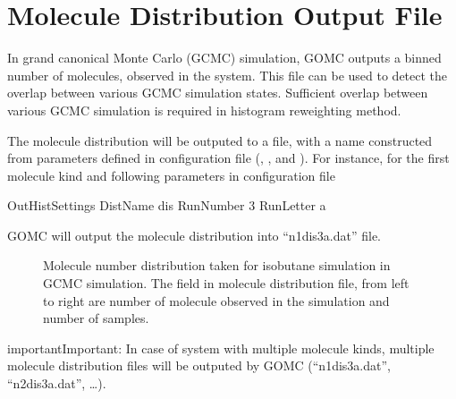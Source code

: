 \documentclass[letterpaper,10pt,english]{sphinxmanual}
\begin{document}
\section{Molecule Distribution Output File}
\label{\detokenize{output_file:molecule-distribution-output-file}}
\sphinxAtStartPar
In grand canonical Monte Carlo (GCMC) simulation, GOMC outputs a binned number of molecules, observed
in the system. This file can be used to detect the overlap between various GCMC simulation states.
Sufficient overlap between various GCMC simulation is required in histogram reweighting method.

\sphinxAtStartPar
The molecule distribution will be outputed to a file, with a name constructed from parameters defined
in configuration file (, , and ). For instance, for the first
molecule kind and following parameters in configuration file

\begin{sphinxVerbatim}[commandchars=\\\{\}]
\PYGZsh{}\PYGZsh{}\PYGZsh{}\PYGZsh{}\PYGZsh{}\PYGZsh{}\PYGZsh{}\PYGZsh{}\PYGZsh{}\PYGZsh{}\PYGZsh{}\PYGZsh{}\PYGZsh{}\PYGZsh{}\PYGZsh{}\PYGZsh{}\PYGZsh{}\PYGZsh{}\PYGZsh{}\PYGZsh{}\PYGZsh{}\PYGZsh{}\PYGZsh{}\PYGZsh{}\PYGZsh{}\PYGZsh{}\PYGZsh{}\PYGZsh{}\PYGZsh{}\PYGZsh{}\PYGZsh{}\PYGZsh{}\PYGZsh{}
\PYGZsh{} OutHistSettings
\PYGZsh{}\PYGZsh{}\PYGZsh{}\PYGZsh{}\PYGZsh{}\PYGZsh{}\PYGZsh{}\PYGZsh{}\PYGZsh{}\PYGZsh{}\PYGZsh{}\PYGZsh{}\PYGZsh{}\PYGZsh{}\PYGZsh{}\PYGZsh{}\PYGZsh{}\PYGZsh{}\PYGZsh{}\PYGZsh{}\PYGZsh{}\PYGZsh{}\PYGZsh{}\PYGZsh{}\PYGZsh{}\PYGZsh{}\PYGZsh{}\PYGZsh{}\PYGZsh{}\PYGZsh{}\PYGZsh{}\PYGZsh{}\PYGZsh{}
DistName   dis
RunNumber  3
RunLetter  a
\end{sphinxVerbatim}

\sphinxAtStartPar
GOMC will output the molecule distribution into “n1dis3a.dat” file.

\begin{figure}[htbp]
\centering
\capstart

\noindent{}
\caption{Molecule number distribution taken for isobutane simulation in GCMC simulation. The field in
molecule distribution file, from left to right are number of molecule observed in the
simulation and number of samples.}\label{\detokenize{output_file:id15}}\end{figure}

\begin{sphinxadmonition}{important}{Important:}
\sphinxAtStartPar
In case of system with multiple molecule kinds, multiple molecule distribution files will be
outputed by GOMC (“n1dis3a.dat”, “n2dis3a.dat”, …).
\end{sphinxadmonition}
\end{document}
